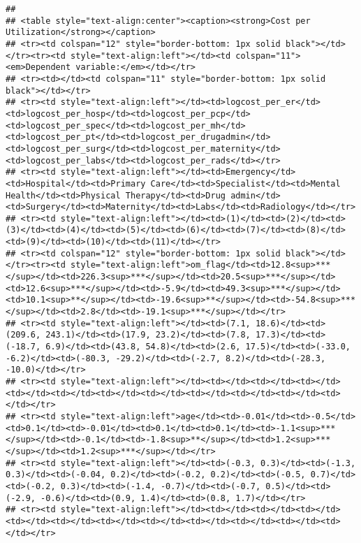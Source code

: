 \documentclass[]{article}
\begin{document}
\begin{verbatim}
## 
## <table style="text-align:center"><caption><strong>Cost per Utilization</strong></caption>
## <tr><td colspan="12" style="border-bottom: 1px solid black"></td></tr><tr><td style="text-align:left"></td><td colspan="11"><em>Dependent variable:</em></td></tr>
## <tr><td></td><td colspan="11" style="border-bottom: 1px solid black"></td></tr>
## <tr><td style="text-align:left"></td><td>logcost_per_er</td><td>logcost_per_hosp</td><td>logcost_per_pcp</td><td>logcost_per_spec</td><td>logcost_per_mh</td><td>logcost_per_pt</td><td>logcost_per_drugadmin</td><td>logcost_per_surg</td><td>logcost_per_maternity</td><td>logcost_per_labs</td><td>logcost_per_rads</td></tr>
## <tr><td style="text-align:left"></td><td>Emergency</td><td>Hospital</td><td>Primary Care</td><td>Specialist</td><td>Mental Health</td><td>Physical Therapy</td><td>Drug admin</td><td>Surgery</td><td>Maternity</td><td>Labs</td><td>Radiology</td></tr>
## <tr><td style="text-align:left"></td><td>(1)</td><td>(2)</td><td>(3)</td><td>(4)</td><td>(5)</td><td>(6)</td><td>(7)</td><td>(8)</td><td>(9)</td><td>(10)</td><td>(11)</td></tr>
## <tr><td colspan="12" style="border-bottom: 1px solid black"></td></tr><tr><td style="text-align:left">om_flag</td><td>12.8<sup>***</sup></td><td>226.3<sup>***</sup></td><td>20.5<sup>***</sup></td><td>12.6<sup>***</sup></td><td>-5.9</td><td>49.3<sup>***</sup></td><td>10.1<sup>**</sup></td><td>-19.6<sup>**</sup></td><td>-54.8<sup>***</sup></td><td>2.8</td><td>-19.1<sup>***</sup></td></tr>
## <tr><td style="text-align:left"></td><td>(7.1, 18.6)</td><td>(209.6, 243.1)</td><td>(17.9, 23.2)</td><td>(7.8, 17.3)</td><td>(-18.7, 6.9)</td><td>(43.8, 54.8)</td><td>(2.6, 17.5)</td><td>(-33.0, -6.2)</td><td>(-80.3, -29.2)</td><td>(-2.7, 8.2)</td><td>(-28.3, -10.0)</td></tr>
## <tr><td style="text-align:left"></td><td></td><td></td><td></td><td></td><td></td><td></td><td></td><td></td><td></td><td></td><td></td></tr>
## <tr><td style="text-align:left">age</td><td>-0.01</td><td>-0.5</td><td>0.1</td><td>-0.01</td><td>0.1</td><td>0.1</td><td>-1.1<sup>***</sup></td><td>-0.1</td><td>-1.8<sup>**</sup></td><td>1.2<sup>***</sup></td><td>1.2<sup>***</sup></td></tr>
## <tr><td style="text-align:left"></td><td>(-0.3, 0.3)</td><td>(-1.3, 0.3)</td><td>(-0.04, 0.2)</td><td>(-0.2, 0.2)</td><td>(-0.5, 0.7)</td><td>(-0.2, 0.3)</td><td>(-1.4, -0.7)</td><td>(-0.7, 0.5)</td><td>(-2.9, -0.6)</td><td>(0.9, 1.4)</td><td>(0.8, 1.7)</td></tr>
## <tr><td style="text-align:left"></td><td></td><td></td><td></td><td></td><td></td><td></td><td></td><td></td><td></td><td></td><td></td></tr>

\end{verbatim}
\end{document}
